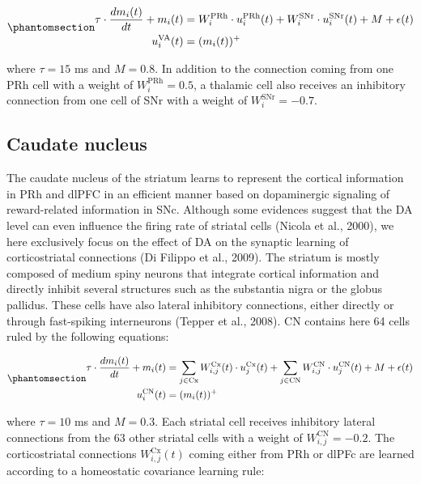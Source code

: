 \documentclass[
  11pt,
  a4paper,
]{scrbook}
\begin{document}
\begin{equation}\phantomsection\label{eq-ficn:mp-va}{
\begin{aligned}
    \tau \cdot \frac{d m_i(t)}{d t} + m_i(t) & =   W^{\text{PRh}}_{i} \cdot u^{\text{PRh}}_i(t)  +  W^{\text{SNr}}_{i} \cdot u^{\text{SNr}}_i(t) + M + \epsilon(t)  \\
    u^{\text{VA}}_i(t) & =  (m_i(t))^+
\end{aligned}
}\end{equation}

where \(\tau = 15\) ms and \(M = 0.8\). In addition to the connection
coming from one PRh cell with a weight of \(W^{\text{PRh}}_{i} = 0.5\),
a thalamic cell also receives an inhibitory connection from one cell of
SNr with a weight of \(W^{\text{SNr}}_{i} = -0.7\).

\subsection{Caudate nucleus}\label{caudate-nucleus}

The caudate nucleus of the striatum learns to represent the cortical
information in PRh and dlPFC in an efficient manner based on
dopaminergic signaling of reward-related information in SNc. Although
some evidences suggest that the DA level can even influence the firing
rate of striatal cells (Nicola et al., 2000), we here exclusively focus
on the effect of DA on the synaptic learning of corticostriatal
connections (Di Filippo et al., 2009). The striatum is mostly composed
of medium spiny neurons that integrate cortical information and directly
inhibit several structures such as the substantia nigra or the globus
pallidus. These cells have also lateral inhibitory connections, either
directly or through fast-spiking interneurons (Tepper et al., 2008). CN
contains here 64 cells ruled by the following equations:

\begin{equation}\phantomsection\label{eq-ficn:mp-cn}{
\begin{aligned}
    \tau \cdot \frac{d m_i(t)}{d t} + m_i(t) & = \displaystyle\sum_{j \in \text{Cx}} W^{\text{Cx}}_{i,j}(t) \cdot u^{\text{Cx}}_j(t) + \displaystyle\sum_{j \in \text{CN}} W^{\text{CN}}_{i,j} \cdot u^{\text{CN}}_j(t)  +  M + \epsilon(t) \\
    u^{\text{CN}}_i(t) & =  (m_i(t))^+
\end{aligned}
}\end{equation}

where \(\tau = 10\) ms and \(M = 0.3\). Each striatal cell receives
inhibitory lateral connections from the 63 other striatal cells with a
weight of \(W^{\text{CN}}_{i,j} = -0.2\). The corticostriatal
connections \(W^{\text{Cx}}_{i,j}(t)\) coming either from PRh or dlPFc
are learned according to a homeostatic covariance learning rule:
\end{document}
